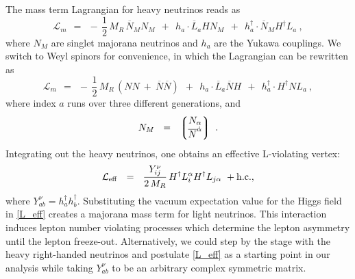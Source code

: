\documentclass[12pt]{revtex4}
\newcommand{\ov}{\overline}
\begin{document}
The mass term Lagrangian for heavy neutrinos reads as
\begin{equation}
	\mathcal{L}_m  ~~=~~ -\,\frac 12\, M_R\, \ov{N}{}_MN_M ~~+~~
				h_a\cdot \ov{L}_aHN_M ~~+~~  
				h_a^\dagger\cdot \ov{N}{}_MH^\dagger L_a~,
\end{equation}
	where $ N_M $ are singlet majorana neutrinos and $ h_a $ are the Yukawa couplings.
	We switch to Weyl spinors for convenience, in which the Lagrangian can be rewritten as
\begin{equation}
	\mathcal{L}_m  ~~=~~ 
	-\,\frac 12\, M_R\, \left( NN ~+~ \ov{N}\ov{N} \right) ~~+~~
				h_a\cdot \ov{L}_a\ov{ N}H ~~+~~  
				h_a^\dagger\cdot H^\dagger N L_a~,
\end{equation}
	where index $a$ runs over three different generations, and
\[	
	N_M ~~=~~ \left\lgroup 
		\begin{matrix}
			N_\alpha \\
			\ov{N}^{\dot{\alpha}}
		\end{matrix}
		\right\rgroup~.
\]
	Integrating out the heavy neutrinos, one obtains an effective L-violating vertex:
\begin{equation}
\label{L_eff}
	\mathcal{L}_{\rm eff} ~~=~~ \frac{Y_{ij}^\nu}{2\, M_R} \, H^\dag L_i^\alpha H^\dag L_{j\alpha}~
+{\rm h.c.},
\end{equation}
where $Y_{ab}^\nu=h_a^\dag h_b^\dag$.
	Substituting the vacuum expectation value 
for the Higgs field in \eqref{L_eff}
	creates a majorana mass term for light neutrinos. 
This interaction induces lepton number
violating processes which determine the lepton asymmetry
	until the lepton freeze-out. Alternatively, we could step by the stage with the heavy right-handed 
	neutrinos and postulate \eqref{L_eff} as a starting point in our analysis while taking $Y^\nu_{ab}$
	to be an arbitrary complex symmetric matrix. 
	

\end{document}

